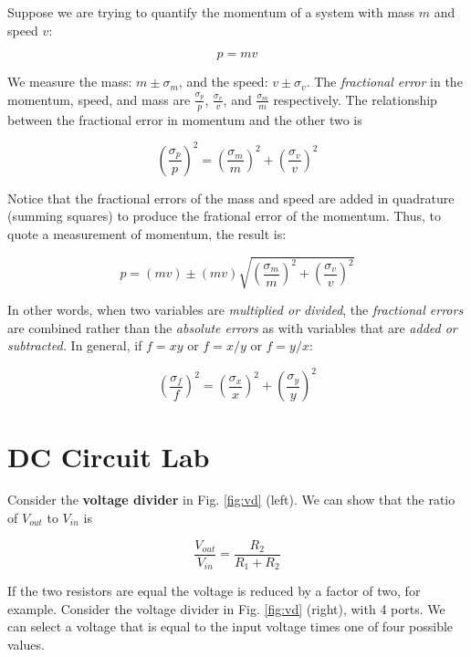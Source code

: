 \documentclass[12pt]{article}
\begin{document}
Suppose we are trying to quantify the momentum of a system with mass $m$ and speed $v$:

\begin{equation}
p = mv
\end{equation}

We measure the mass: $m\pm \sigma_m$, and the speed: $v\pm\sigma_v$.  The \textit{fractional error} in the momentum, speed, and mass are $\frac{\sigma_p}{p}$, $\frac{\sigma_v}{v}$, and $\frac{\sigma_m}{m}$ respectively.  The relationship between the fractional error in momentum and the other two is

\begin{equation}
\left(\frac{\sigma_p}{p}\right)^2 = \left(\frac{\sigma_m}{m}\right)^2 + \left(\frac{\sigma_v}{v}\right)^2
\end{equation}

Notice that the fractional errors of the mass and speed are added in quadrature (summing squares) to produce the frational error of the momentum.  Thus, to quote a measurement of momentum, the result is:

\begin{equation}
p = (mv) \pm (mv) \sqrt{\left(\frac{\sigma_m}{m}\right)^2 + \left(\frac{\sigma_v}{v}\right)^2}
\end{equation}

In other words, when two variables are \textit{multiplied or divided}, the \textit{fractional errors} are combined rather than the \textit{absolute errors} as with variables that are \textit{added or subtracted.} In general, if $f=xy$ or $f = x/y$ or $f=y/x$:

\begin{equation}
\left(\frac{\sigma_f}{f}\right)^2 = \left(\frac{\sigma_x}{x}\right)^2 + \left(\frac{\sigma_y}{y}\right)^2 \label{eq:multi}
\end{equation}

\section{DC Circuit Lab}

Consider the \textbf{voltage divider} in Fig. \ref{fig:vd} (left).  We can show that the ratio of $V_{out}$ to $V_{in}$ is

\begin{equation}
\frac{V_{out}}{V_{in}} = \frac{R_2}{R_1+R_2}
\end{equation}

If the two resistors are equal the voltage is reduced by a factor of two, for example.  Consider the voltage divider in Fig. \ref{fig:vd} (right), with 4 ports.  We can select a voltage that is equal to the input voltage times one of four possible values.
\end{document}
